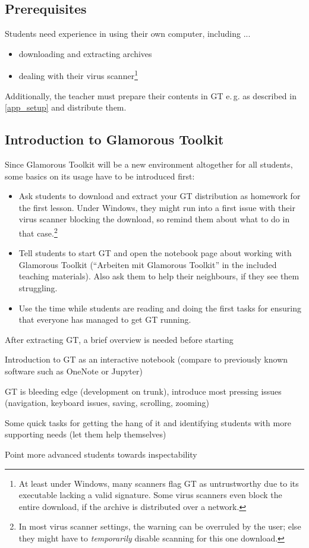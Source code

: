 \subsection{Prerequisites}

Students need experience in using their own computer, including ...
\begin{itemize}
\item downloading and extracting archives
\item dealing with their virus scanner\footnote{At least under Windows, many scanners flag GT as untrustworthy due to its executable lacking a valid signature. Some virus scanners even block the entire download, if the archive is distributed over a network.}
\end{itemize}

Additionally, the teacher must prepare their contents in GT e.\,g. as described in \ref{app_setup} and distribute them.


\subsection{Introduction to Glamorous Toolkit} \label{ssc_lesson_gt}

Since Glamorous Toolkit will be a new environment altogether for all students, some basics on its usage have to be introduced first:

\begin{itemize}
\item Ask students to download and extract your GT distribution as homework for the first lesson. Under Windows, they might run into a first issue with their virus scanner blocking the download, so remind them about what to do in that case.\footnote{In most virus scanner settings, the warning can be overruled by the user; else they might have to \emph{temporarily} disable scanning for this one download.}
\item Tell students to start GT and open the notebook page about working with Glamorous Toolkit (``Arbeiten mit Glamorous Toolkit'' in the included teaching materials). Also ask them to help their neighbours, if they see them struggling.
\item Use the time while students are reading and doing the first tasks for ensuring that everyone has managed to get GT running.
\end{itemize}


\begin{todo}
\item After extracting GT, a brief overview is needed before starting
\item Introduction to GT as an interactive notebook (compare to previously known software such as OneNote or Jupyter)
\item GT is bleeding edge (development on trunk), introduce most pressing issues (navigation, keyboard issues, saving, scrolling, zooming)
\item Some quick tasks for getting the hang of it and identifying students with more supporting needs (let them help themselves)
\item Point more advanced students towards inspectability
\end{todo}


